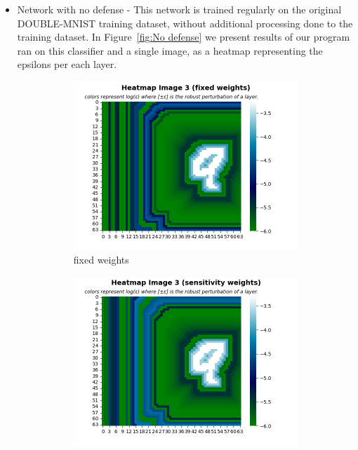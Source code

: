 \begin{itemize}
    \item Network with no defense - This network is trained regularly on the original DOUBLE-MNIST training dataset, without additional processing done to the training dataset.
    In Figure~\ref{fig:No defense} we present results of our program ran on this classifier and a single image, as a heatmap representing the epsilons per each layer.
    \begin{figure}
         \centering
         \begin{subfigure}[b]{0.4\textwidth}
             \centering
             \includegraphics[width=\textwidth]{no_defense_fixed_weights.png}
             \caption{fixed weights}
             \label{sub-fig:No defense FW}
         \end{subfigure}
         \hfill
         \begin{subfigure}[b]{0.4\textwidth}
             \centering
             \includegraphics[width=\textwidth]{no_defense_sensitivity_weights.png}

\end{subfigure}
\end{figure}
\end{itemize}
